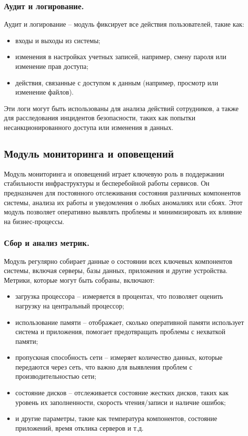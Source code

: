 \subsubsection{Аудит и логирование.} Аудит и логирование -- модуль фиксирует все действия пользователей, такие как:
\begin{itemize}
    \item входы и выходы из системы;
    \item изменения в настройках учетных записей, например, смену пароля или изменение прав доступа;
    \item действия, связанные с доступом к данным (например, просмотр или изменение файлов).
\end{itemize}

Эти логи могут быть использованы для анализа действий сотрудников, а также для расследования инцидентов безопасности, таких как попытки несанкционированного доступа или изменения в данных.


\subsection{Модуль мониторинга и оповещений}
\label{sec:monitoring_alerting_functionality}

Модуль мониторинга и оповещений играет ключевую роль в поддержании стабильности инфраструктуры и бесперебойной работы сервисов. Он предназначен для постоянного отслеживания состояния различных компонентов системы, анализа их работы и уведомления о любых аномалиях или сбоях. Этот модуль позволяет оперативно выявлять проблемы и минимизировать их влияние на бизнес-процессы.

\subsubsection{Сбор и анализ метрик.} Модуль регулярно собирает данные о состоянии всех ключевых компонентов системы, включая серверы, базы данных, приложения и другие устройства. Метрики, которые могут быть собраны, включают:
\begin{itemize}
    \item загрузка процессора -- измеряется в процентах, что позволяет оценить нагрузку на центральный процессор;
    \item использование памяти -- отображает, сколько оперативной памяти использует система и приложения, помогает предотвращать проблемы с нехваткой памяти;
    \item пропускная способность сети -- измеряет количество данных, которые передаются через сеть, что важно для выявления проблем с производительностью сети;
    \item состояние дисков -- отслеживается состояние жестких дисков, таких как уровень их заполненности, скорость чтения/записи и наличие ошибок;
    \item и другие параметры, такие как температура компонентов, состояние приложений, время отклика серверов и т.д.
\end{itemize}

